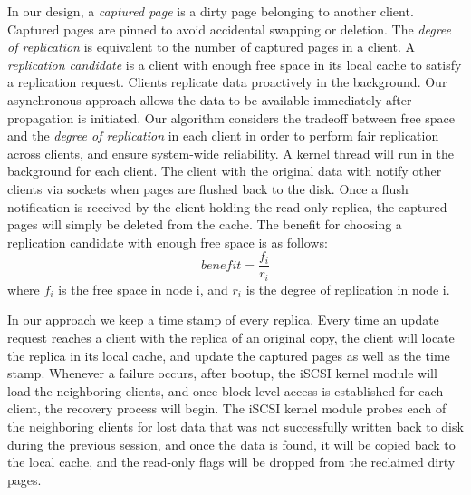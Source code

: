 In our design, a \textit{captured page} is a dirty page belonging to another client. Captured pages are pinned to avoid accidental swapping or deletion. The \textit{degree of replication} is equivalent to the number of captured pages in a client. A \textit{replication candidate} is a client with enough free space in its local cache to satisfy a replication request. Clients replicate data proactively in the background. Our asynchronous approach allows the data to be available immediately after propagation is initiated. Our algorithm considers the tradeoff between free space and the \textit{degree of replication} in each client in order to perform fair replication across clients, and ensure system-wide reliability. A kernel thread will run in the background for each client. The client with the original data with notify other clients via sockets when pages are flushed back to the disk. Once a flush notification is received by the client holding the read-only replica, the captured pages will simply be deleted from the cache. The benefit for choosing a replication candidate with enough free space is as follows: \[{benefit}=\frac{f_i}{r_i}\] where $f_i$ is the free space in node i, and $r_i$ is the degree of replication in node i.

In our approach we keep a time stamp of every replica. Every time an update request reaches a client with the replica of an original copy, the client will locate the replica in its local cache, and update the captured pages as well as the time stamp. Whenever a failure occurs, after bootup, the iSCSI kernel module will load the neighboring clients, and once block-level access is established for each client, the recovery process will begin. The iSCSI kernel module probes each of the neighboring clients for lost data that was not successfully written back to disk during the previous session, and once the data is found, it will be copied back to the local cache, and the read-only flags will be dropped from the reclaimed dirty pages.

\label{approach}
